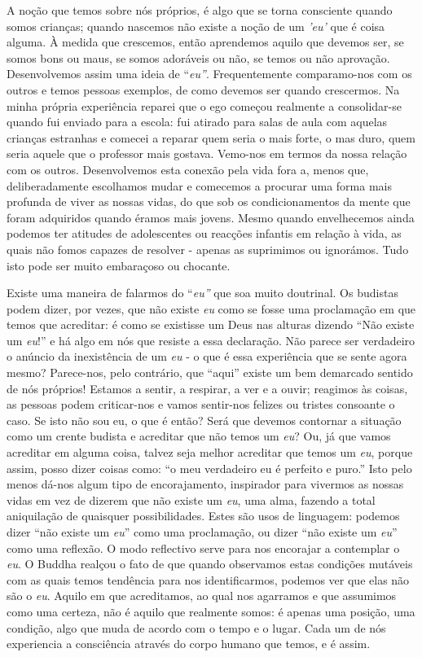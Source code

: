 A noção que temos sobre nós próprios, é algo que se torna consciente
quando somos crianças; quando nascemos não existe a noção de um
\emph{'eu'} que é coisa alguma. À medida que crescemos, então aprendemos
aquilo que devemos ser, se somos bons ou maus, se somos adoráveis ou
não, se temos ou não aprovação. Desenvolvemos assim uma ideia de
``\emph{eu''}. Frequentemente comparamo-nos com os outros e temos
pessoas exemplos, de como devemos ser quando crescermos. Na minha
própria experiência reparei que o ego começou realmente a consolidar-se
quando fui enviado para a escola: fui atirado para salas de aula com
aquelas crianças estranhas e comecei a reparar quem seria o mais forte,
o mas duro, quem seria aquele que o professor mais gostava. Vemo-nos em
termos da nossa relação com os outros. Desenvolvemos esta conexão pela
vida fora a, menos que, deliberadamente escolhamos mudar e comecemos a
procurar uma forma mais profunda de viver as nossas vidas, do que sob os
condicionamentos da mente que foram adquiridos quando éramos mais
jovens. Mesmo quando envelhecemos ainda podemos ter atitudes de
adolescentes ou reacções infantis em relação à vida, as quais não fomos
capazes de resolver - apenas as suprimimos ou ignorámos. Tudo isto pode
ser muito embaraçoso ou chocante.

Existe uma maneira de falarmos do ``\emph{eu''} que soa muito doutrinal.
Os budistas podem dizer, por vezes, que não existe \emph{eu} como se
fosse uma proclamação em que temos que acreditar: é como se existisse um
Deus nas alturas dizendo ``Não existe um \emph{eu}!'' e há algo em nós
que resiste a essa declaração. Não parece ser verdadeiro o anúncio da
inexistência de um \emph{eu} - o que é essa experiência que se sente
agora mesmo? Parece-nos, pelo contrário, que ``aqui'' existe um bem
demarcado sentido de nós próprios! Estamos a sentir, a respirar, a ver e
a ouvir; reagimos às coisas, as pessoas podem criticar-nos e vamos
sentir-nos felizes ou tristes consoante o caso. Se isto não sou eu, o
que é então? Será que devemos contornar a situação como um crente
budista e acreditar que não temos um \emph{eu}? Ou, já que vamos
acreditar em alguma coisa, talvez seja melhor acreditar que temos um
\emph{eu}, porque assim, posso dizer coisas como: ``o meu verdadeiro eu
é perfeito e puro.'' Isto pelo menos dá-nos algum tipo de encorajamento,
inspirador para vivermos as nossas vidas em vez de dizerem que não
existe um \emph{eu}, uma alma, fazendo a total aniquilação de quaisquer
possibilidades. Estes são usos de linguagem: podemos dizer ``não existe
um \emph{eu}'' como uma proclamação, ou dizer ``não existe um
\emph{eu}'' como uma reflexão. O modo reflectivo serve para nos
encorajar a contemplar o \emph{eu}. O Buddha realçou o fato de que
quando observamos estas condições mutáveis com as quais temos tendência
para nos identificarmos, podemos ver que elas não são o \emph{eu}.
Aquilo em que acreditamos, ao qual nos agarramos e que assumimos como
uma certeza, não é aquilo que realmente somos: é apenas uma posição, uma
condição, algo que muda de acordo com o tempo e o lugar. Cada um de nós
experiencia a consciência através do corpo humano que temos, e é assim.

